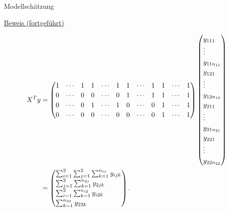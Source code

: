 \documentclass[
  8pt,
  ignorenonframetext,
]{beamer}
\begin{document}
\begin{frame}{Modellschätzung}
\protect\hypertarget{modellschuxe4tzung-8}{}
\footnotesize
\vspace{1mm}

\underline{Beweis (fortgeführt)}

\tiny

\begin{align}
\renewcommand{\arraystretch}{1.2}
\begin{split}
X^Ty
& =
\setcounter{MaxMatrixCols}{20}
\begin{pmatrix}
1 & \cdots & 1 & 1 & \cdots & 1 & 1 & \cdots & 1 & 1 & \cdots & 1   \\
0 & \cdots & 0 & 0 & \cdots & 0 & 1 & \cdots & 1 & 1 & \cdots & 1   \\
0 & \cdots & 0 & 1 & \cdots & 1 & 0 & \cdots & 0 & 1 & \cdots & 1   \\
0 & \cdots & 0 & 0 & \cdots & 0 & 0 & \cdots & 0 & 1 & \cdots & 1   \\
\end{pmatrix}
\begin{pmatrix*}[l]
y_{111}     \\  \vdots  \\ y_{11n_{11}}
\\
y_{121}     \\  \vdots  \\ y_{12n_{12}}
\\
y_{211}     \\  \vdots  \\ y_{21n_{21}}
\\
y_{221}     \\  \vdots  \\ y_{22n_{22}}
\end{pmatrix*}
\\
& =
\begin{pmatrix*}[l]
\sum_{i=1}^2 \sum_{j=1}^2 \sum_{k = 1}^{n_{ij}} y_{ijk}     \\
\sum_{j=1}^2 \sum_{k = 1}^{n_{2j}} y_{2jk}                  \\
\sum_{i=1}^2 \sum_{k = 1}^{n_{i2}} y_{i2k}                  \\
\sum_{k = 1}^{n_{22}} y_{22k}                               \\
\end{pmatrix*}.
\end{split}
\end{align}
\end{frame}
\end{document}

